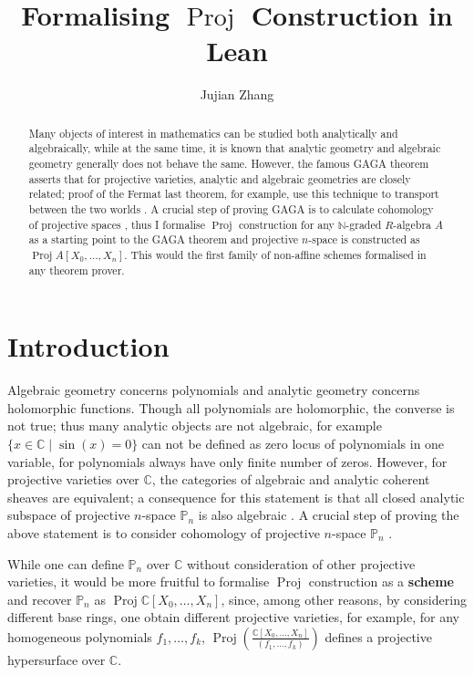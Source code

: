 \documentclass[a4paper,UKenglish,cleveref, autoref, thm-restate]{lipics-v2021}
\title{Formalising $\operatorname{Proj}$ Construction in Lean} %
\author{Jujian Zhang}{Department of Mathematics, Imperial College London \and \url{https://www.imperial.ac.uk/}}{jujian.zhang19@imperial.ac.uk}{https://orcid.org/0000-0001-7340-2703}{Schr\"odinger Scholarship Scheme}
\begin{document}
\maketitle

\begin{abstract}
    Many objects of interest in mathematics can be studied both analytically and algebraically, while at the same time, it is known that analytic geometry and algebraic geometry generally does not behave the same. However, the famous GAGA theorem asserts that for projective varieties, analytic and algebraic geometries are closely related; proof of the Fermat last theorem, for example, use this technique to transport between the two worlds \cite{serre1955geometrie}. A crucial step of proving GAGA is to calculate cohomology of projective spaces \cite{neeman2007algebraic,godement1958topologie}, thus I formalise $\operatorname{Proj}$ construction for any $\mathbb{N}$-graded $R$-algebra $A$ as a starting point to the GAGA theorem and projective $n$-space is constructed as $\operatorname{Proj} A[X_0,\dots, X_n]$. This would the first family of non-affine schemes formalised in any theorem prover.
\end{abstract}

\section{Introduction}
Algebraic geometry concerns polynomials and analytic geometry concerns holomorphic functions. Though all polynomials are holomorphic, the converse is not true; thus many analytic objects are not algebraic, for example $\{x \in \mathbb{C} \mid \sin(x) = 0\}$ can not be defined as zero locus of polynomials in one variable, for polynomials always have only finite number of zeros. However, for projective varieties over $\mathbb{C}$, the categories of algebraic and analytic coherent sheaves are equivalent; a  consequence for this statement is that all closed analytic subspace of projective $n$-space $\mathbb{P}_n$ is also algebraic \cite{serre1955geometrie,chowtheorem}. A crucial step of proving the above statement is to consider cohomology of projective $n$-space $\mathbb{P}_n$  \cite{neeman2007algebraic}. 

While one can define $\mathbb{P}_n$ over $\mathbb{C}$ without consideration of other projective varieties, it would be more fruitful to formalise $\operatorname{Proj}$ construction as a \textbf{scheme} and recover $\mathbb{P}_n$ as $\operatorname{Proj} \mathbb{C}[X_0,\dots, X_n]$, since, among other reasons, by considering different base rings, one obtain different projective varieties, for example, for any homogeneous polynomials $f_1,\dots, f_k$, $\operatorname{Proj}\left(\frac{\mathbb{C}[X_0,\dots,X_n]}{(f_1,\dots,f_k)}\right)$ defines a projective hypersurface over $\mathbb{C}$.
\end{document}
